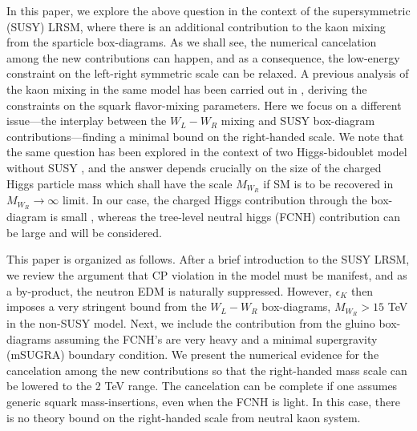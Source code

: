 \documentclass[prd,aps,preprint,tightenlines,superscriptaddress]{revtex4}
\begin{document}
In this paper, we explore the above question in the context of the supersymmetric
(SUSY) LRSM, where there is an additional contribution to the kaon mixing from the
sparticle box-diagrams. As we shall see, the numerical cancelation among the new
contributions can happen, and as a consequence, the low-energy constraint on the
left-right symmetric scale can be relaxed. A previous analysis of the kaon mixing in
the same model has been carried out in \cite{Frank:2003yi}, deriving the constraints on
the squark flavor-mixing parameters. Here we focus on a different issue---the interplay 
between the $W_L-W_R$ mixing and SUSY box-diagram contributions---finding a minimal bound on 
the right-handed scale. We note that the same question has been explored in the context 
of two Higgs-bidoublet model without SUSY \cite{Wu:2007kt}, and the answer depends 
crucially on the size of the charged Higgs particle mass which shall have the scale $M_{W_R}$
if SM is to be recovered in $M_{W_R}\rightarrow \infty$ limit. In our case, the charged Higgs
contribution through the box-diagram is small \cite{Basecq:1985cr}, whereas the tree-level
neutral higgs (FCNH) contribution can be large and will be considered.

This paper is organized as follows. After a brief introduction to the SUSY LRSM, we review the
argument that CP violation in the model must be manifest, and as a by-product, the neutron EDM is naturally
suppressed. However, $\epsilon_K$ then imposes a very stringent bound from
the $W_L-W_R$ box-diagrams, $M_{W_R}>15$ TeV in the non-SUSY model. Next, we include the
contribution from the gluino box-diagrams assuming the FCNH's are very heavy and a minimal supergravity (mSUGRA) 
boundary condition. We present the numerical evidence for the cancelation among the
new contributions so that the right-handed mass scale can be lowered to the 2 TeV range.
The cancelation can be complete if one assumes generic squark mass-insertions,
even when the FCNH is light. In this case, there is no theory bound on the right-handed scale 
from neutral kaon system. 
\end{document}
